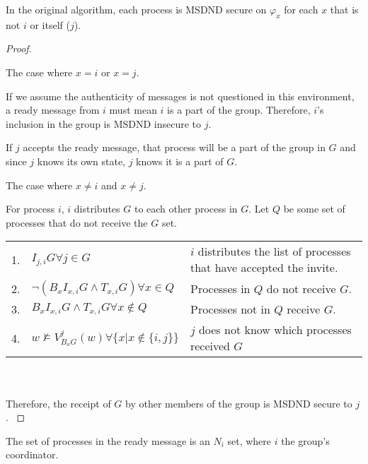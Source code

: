 \begin{thm}
    In the original algorithm, each process is MSDND secure on $\varphi_x$ for each $x$ that is not $i$ or itself ($j$).
\end{thm}

\begin{proof}
\begin{case}
    The case where $x = i$ or $x = j$.
\end{case}

If we assume the authenticity of messages is not questioned in this environment, a ready message from $i$ must mean $i$ is a part of the group.
Therefore, $i$'s inclusion in the group is MSDND insecure to $j$.

If $j$ accepts the ready message, that process will be a part of the group in $G$ and since $j$ knows its own state, $j$ knows it is a part of $G$.

\begin{case}
    The case where $x \neq i$ and $x \neq j$.
\end{case}

For process $i$, $i$ distributes $G$ to each other process in $G$.
Let $Q$ be some set of processes that do not receive the $G$ set.

\begin{table}[h!]
\centering
\small
\begin{tabularx}{\linewidth}{l X X}
1. & $I_{j,i} G \forall j \in G $ & $i$ distributes the list of processes that have accepted the invite.  \\
2. & $\neg(B_x I_{x,i} G \wedge T_{x,i} G) \forall x \in Q$ & Processes in $Q$ do not receive $G$. \\
3. & $B_x I_{x,i} G \wedge T_{x,i} G \forall x \not \in Q$ & Processes not in $Q$ receive $G$. \\
    4. & $w \not \vDash V_{B_x G}^{j}(w) \forall \{x | x \not \in \{i,j\}\}$ & $j$ does not know which processes received $G$ \\
\end{tabularx} \\~\\
Therefore, the receipt of $G$ by other members of the group is MSDND secure to $j$.
\label{tab:readynsetproof}
\end{table}
\end{proof}

\begin{cor}
    The set of processes in the ready message is an $N_i$ set, where $i$ the group's coordinator.
\end{cor}

